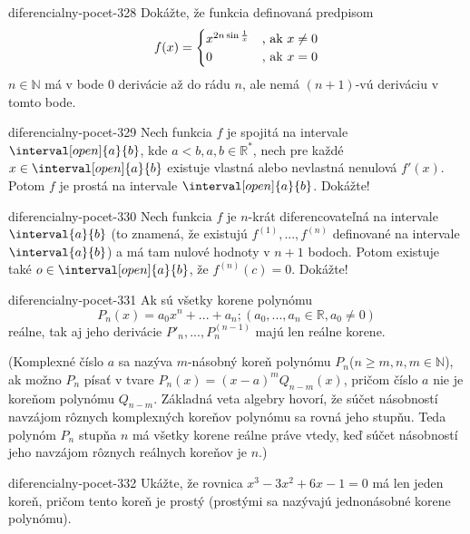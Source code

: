 \begin{defproblem}{diferencialny-pocet-328}
Dokážte, že funkcia definovaná predpisom
\[
  f(x) =
  \begin{cases}
    x^{2n \sin \frac{1}{x}} & $, ak $ x \neq 0 \\
    0 &  $, ak $ x=0
  \end{cases}
\]
$n\in\mathbb{N}$ má v bode $0$ derivácie až do rádu $n$, ale nemá $(n+1)$-vú deriváciu v tomto bode.
\end{defproblem}

\begin{defproblem}{diferencialny-pocet-329}
Nech funkcia $f$ je spojitá na intervale $\interval[open]{a}{b}$, kde
$a<b,a,b\in\mathbb{R^*}$, nech pre každé $x\in \interval[open]{a}{b}$ existuje
vlastná alebo nevlastná nenulová $f'(x)$. Potom $f$ je prostá na intervale
$\interval[open]{a}{b}$. Dokážte!
\end{defproblem}

\begin{defproblem}{diferencialny-pocet-330}
Nech funkcia $f$ je $n$-krát diferencovateľná na intervale $\interval{a}{b}$ (to
znamená, že existujú $f^{(1)},...,f^{(n)}$ definované na intervale
$\interval{a}{b}$) a má tam nulové hodnoty v $n+1$ bodoch. Potom existuje také
$o\in \interval[open]{a}{b}$, že $f^{(n)}(c)=0$. Dokážte!
\end{defproblem}

\begin{defproblem}{diferencialny-pocet-331}
Ak sú všetky korene polynómu
\[
  P_n(x)=a_0x^n+...+a_n; (a_0,...,a_n\in\mathbb{R},a_0\neq 0)
\]
reálne, tak aj jeho derivácie $P'_n,...,P_n^{(n-1)}$ majú len reálne korene.

(Komplexné číslo $a$ sa nazýva $m$-násobný koreň polynómu $P_n$($n\geq
m,n,m\in\mathbb{N}$), ak možno $P_n$ písať v tvare $P_n(x)=(x-a)^mQ_{n-m}(x)$,
pričom číslo $a$ nie je koreňom polynómu $Q_{n-m}$. Základná veta algebry
hovorí, že súčet násobností navzájom rôznych komplexných koreňov polynómu sa
rovná jeho stupňu. Teda polynóm $P_n$ stupňa $n$ má všetky korene reálne práve
vtedy, keď súčet násobností jeho navzájom rôznych reálnych koreňov je $n$.)
\end{defproblem}

\begin{defproblem}{diferencialny-pocet-332}
Ukážte, že rovnica $x^3-3x^2+6x-1=0$ má len jeden koreň, pričom tento koreň je
prostý (prostými sa nazývajú jednonásobné korene polynómu).
\end{defproblem}

